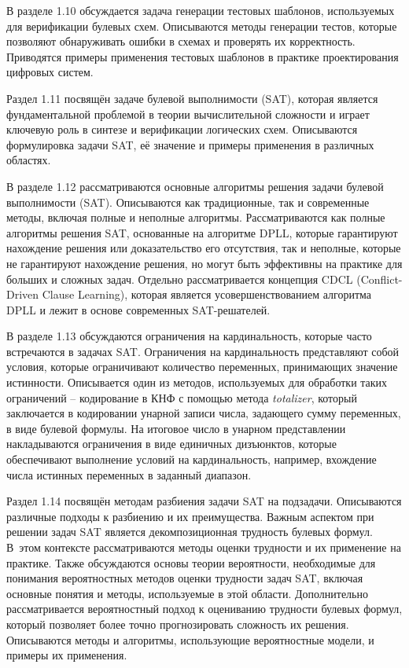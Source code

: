 В разделе 1.10 обсуждается задача генерации тестовых шаблонов, используемых для верификации булевых схем.
Описываются методы генерации тестов, которые позволяют обнаруживать ошибки в схемах и проверять их корректность.
Приводятся примеры применения тестовых шаблонов в практике проектирования цифровых систем.

Раздел 1.11 посвящён задаче булевой выполнимости (SAT), которая является фундаментальной проблемой в теории вычислительной сложности и играет ключевую роль в синтезе и верификации логических схем.
Описываются формулировка задачи SAT, её значение и примеры применения в различных областях.

В разделе 1.12 рассматриваются основные алгоритмы решения задачи булевой выполнимости (SAT).
Описываются как традиционные, так и современные методы, включая полные и неполные алгоритмы.
Рассматриваются как полные алгоритмы решения SAT, основанные на алгоритме DPLL, которые гарантируют нахождение решения или доказательство его отсутствия, так и неполные, которые не гарантируют нахождение решения, но могут быть эффективны на практике для больших и сложных задач.
Отдельно рассматривается концепция CDCL (Conflict-Driven Clause Learning), которая является усовершенствованием алгоритма DPLL и лежит в основе современных SAT-решателей.

В разделе 1.13 обсуждаются ограничения на кардинальность, которые часто встречаются в задачах SAT.
Ограничения на кардинальность представляют собой условия, которые ограничивают количество переменных, принимающих значение истинности.
Описывается один из методов, используемых для обработки таких ограничений \--- кодирование в КНФ с помощью метода \textit{totalizer}, который заключается в кодировании унарной записи числа, задающего сумму переменных, в виде булевой формулы.
На итоговое число в унарном представлении накладываются ограничения в виде единичных дизъюнктов, которые обеспечивают выполнение условий на кардинальность, например, вхождение числа истинных переменных в заданный диапазон.

Раздел 1.14 посвящён методам разбиения задачи SAT на подзадачи.
Описываются различные подходы к разбиению и их преимущества.
Важным аспектом при решении задач SAT является декомпозиционная трудность булевых формул.
В~этом контексте рассматриваются методы оценки трудности и их применение на практике.
Также обсуждаются основы теории вероятности, необходимые для понимания вероятностных методов оценки трудности задач SAT, включая основные понятия и методы, используемые в этой области.
Дополнительно рассматривается вероятностный подход к оцениванию трудности булевых формул, который позволяет более точно прогнозировать сложность их решения.
Описываются методы и алгоритмы, использующие вероятностные модели, и примеры их применения.


